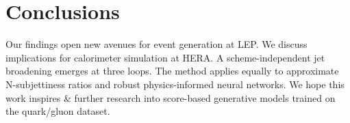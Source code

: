 \section{Conclusions}\label{sec:conclusions}

Our findings open new avenues for event generation at LEP. We discuss
implications for calorimeter simulation at HERA. A scheme-independent
jet broadening emerges at three loops. The method applies equally to
approximate N-subjettiness ratios and robust physics-informed neural
networks. We hope this work inspires & further research into score-based
generative models trained on the quark/gluon dataset.

